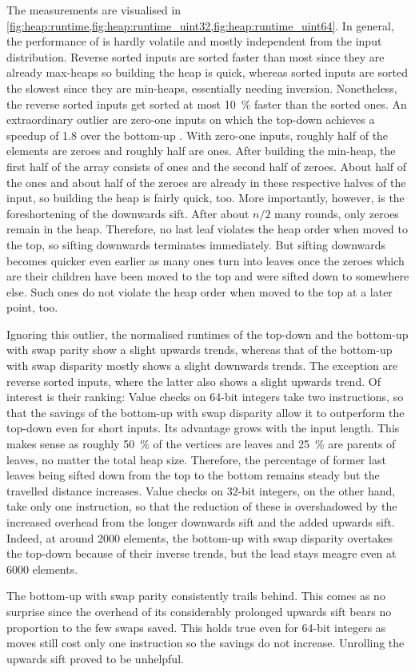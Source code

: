 The measurements are visualised in \cref{fig:heap:runtime,fig:heap:runtime_uint32,fig:heap:runtime_uint64}.
In general, the performance of \HS{} is hardly volatile and mostly independent from the input distribution.
Reverse sorted inputs are sorted faster than most since they are already max-heaps so building the heap is quick, whereas sorted inputs are sorted the slowest since they are min-heaps, essentially needing inversion.
Nonetheless, the reverse sorted inputs get sorted at most \qty{10}{\percent} faster than the sorted ones.
An extraordinary outlier are zero-one inputs on which the top-down \HS{} achieves a speedup of \num{1.8} over the bottom-up \HS{}.
With zero-one inputs, roughly half of the elements are zeroes and roughly half are ones.
After building the min-heap, the first half of the array consists of ones and the second half of zeroes.
About half of the ones and about half of the zeroes are already in these respective halves of the input, so building the heap is fairly quick, too.
More importantly, however, is the foreshortening of the downwards sift.
After about \(n/2\) many rounds, only zeroes remain in the heap.
Therefore, no last leaf violates the heap order when moved to the top, so sifting downwards terminates immediately.
But sifting downwards becomes quicker even earlier as many ones turn into leaves once the zeroes which are their children have been moved to the top and were sifted down to somewhere else.
Such ones do not violate the heap order when moved to the top at a later point, too.


Ignoring this outlier, the normalised runtimes of the top-down \HS{} and the bottom-up \HS{} with swap parity show a slight upwards trends, whereas that of the bottom-up \HS{} with swap disparity mostly shows a slight downwards trends.
The exception are reverse sorted inputs, where the latter also shows a slight upwards trend.
Of interest is their ranking:
Value checks on 64-bit integers take two instructions, so that the savings of the bottom-up \HS{} with swap disparity allow it to outperform the top-down \HS{} even for short inputs.
Its advantage grows with the input length.
This makes sense as roughly \qty{50}{\percent} of the vertices are leaves and \qty{25}{\percent} are parents of leaves, no matter the total heap size.
Therefore, the percentage of former last leaves being sifted down from the top to the bottom remains steady but the travelled distance increases.
Value checks on 32-bit integers, on the other hand, take only one instruction, so that the reduction of these is overshadowed by the increased overhead from the longer downwards sift and the added upwards sift.
Indeed, at around 2000 elements, the bottom-up \HS{} with swap disparity overtakes the top-down \HS{} because of their inverse trends, but the lead stays meagre even at \num{6000} elements.

The bottom-up \HS{} with swap parity consistently trails behind.
This comes as no surprise since the overhead of its considerably prolonged upwards sift bears no proportion to the few swaps saved.
This holds true even for 64-bit integers as moves still cost only one instruction so the savings do not increase.
Unrolling the upwards sift proved to be unhelpful.
